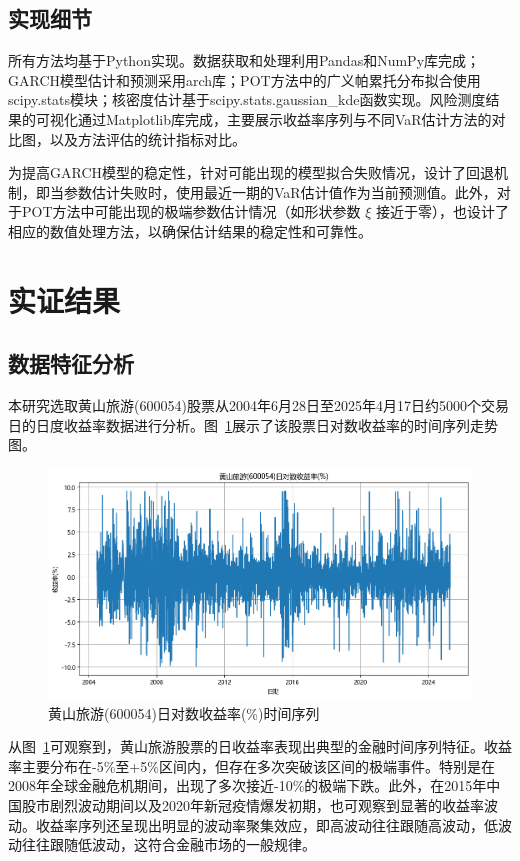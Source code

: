 \documentclass[12pt, a4paper]{article}
\begin{document}
\subsection{实现细节}
所有方法均基于Python实现。数据获取和处理利用Pandas和NumPy库完成；GARCH模型估计和预测采用arch库；POT方法中的广义帕累托分布拟合使用scipy.stats模块；核密度估计基于scipy.stats.gaussian\_kde函数实现。风险测度结果的可视化通过Matplotlib库完成，主要展示收益率序列与不同VaR估计方法的对比图，以及方法评估的统计指标对比。

为提高GARCH模型的稳定性，针对可能出现的模型拟合失败情况，设计了回退机制，即当参数估计失败时，使用最近一期的VaR估计值作为当前预测值。此外，对于POT方法中可能出现的极端参数估计情况（如形状参数 $\xi$ 接近于零），也设计了相应的数值处理方法，以确保估计结果的稳定性和可靠性。

\section{实证结果}

\subsection{数据特征分析}

本研究选取黄山旅游(600054)股票从2004年6月28日至2025年4月17日约5000个交易日的日度收益率数据进行分析。图~\ref{fig:return_series}展示了该股票日对数收益率的时间序列走势图。

\begin{figure}[htbp]
\centering
\includegraphics[width=\textwidth]{./img/return_series.png}
\caption{黄山旅游(600054)日对数收益率(\%)时间序列}
\label{fig:return_series}
\end{figure}

从图~\ref{fig:return_series}可观察到，黄山旅游股票的日收益率表现出典型的金融时间序列特征。收益率主要分布在-5\%至+5\%区间内，但存在多次突破该区间的极端事件。特别是在2008年全球金融危机期间，出现了多次接近-10\%的极端下跌。此外，在2015年中国股市剧烈波动期间以及2020年新冠疫情爆发初期，也可观察到显著的收益率波动。收益率序列还呈现出明显的波动率聚集效应，即高波动往往跟随高波动，低波动往往跟随低波动，这符合金融市场的一般规律。
\end{document}
